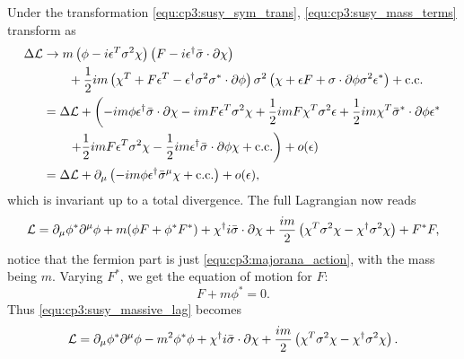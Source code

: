 \begin{problembody}
    \item Under the transformation \eqref{equ:cp3:susy_sym_trans}, \eqref{equ:cp3:susy_mass_terms} transform as
    \begin{align*}
        \Delta\mathcal{L} & \to m\left(\phi - i\epsilon^T\sigma^2\chi\right)
        \left(F - i\epsilon^\dagger\bar{\sigma}\cdot\partial\chi\right)\\
        & \qquad + \frac{1}{2}im
        \left(
            \chi^T 
            + F\epsilon^T 
            - \epsilon^\dagger\sigma^2\sigma^\ast\cdot\partial\phi
        \right)
        \sigma^2
        \left(
            \chi 
            + \epsilon F 
            + \sigma\cdot\partial\phi\sigma^2\epsilon^\ast
        \right)
        + \mathrm{c.c.}\\
        & = \Delta\mathcal{L} + \left(
            - im\phi\epsilon^\dagger\bar{\sigma}\cdot\partial\chi
            - imF\epsilon^T\sigma^2\chi
            + \frac{1}{2}imF\chi^T\sigma^2\epsilon
            + \frac{1}{2}im\chi^T\bar{\sigma}^\ast\cdot\partial\phi\epsilon^\ast\right.\\
            & \qquad \left. + \frac{1}{2}imF\epsilon^T\sigma^2\chi
            - \frac{1}{2}im\epsilon^\dagger\bar{\sigma}\cdot\partial\phi\chi
            + \mathrm{c.c.}
        \right) + o(\epsilon)\\
        & = \Delta\mathcal{L} + \partial_\mu\left(
            -im\phi\epsilon^\dagger\bar{\sigma}^\mu\chi + \mathrm{c.c.}
        \right) + o(\epsilon),
    \end{align*}
    which is invariant up to a total divergence. The full Lagrangian now reads
    \begin{equation}\label{equ:cp3:susy_massive_lag}
        \mathcal{L} = \partial_\mu\phi^\ast\partial^\mu\phi
        + m (\phi F + \phi^\ast F^\ast)
        + \chi^\dagger i\bar{\sigma}\cdot\partial\chi
        + \frac{im}{2}\left(\chi^T\sigma^2\chi - \chi^\dagger\sigma^2\chi\right)
        + F^\ast F,
    \end{equation}
    notice that the fermion part is just \eqref{equ:cp3:majorana_action}, with the mass being $m$. Varying $F^\ast$, we get the equation of motion for $F$:
    \begin{equation*}
        F + m\phi^\ast = 0.
    \end{equation*}
    Thus \eqref{equ:cp3:susy_massive_lag} becomes
    \begin{equation*}
        \mathcal{L} = \partial_\mu\phi^\ast\partial^\mu\phi
        - m^2\phi^\ast\phi
        + \chi^\dagger i\bar{\sigma}\cdot\partial\chi
        + \frac{im}{2}\left(\chi^T\sigma^2\chi - \chi^\dagger\sigma^2\chi\right).
    \end{equation*}


\end{problembody}
